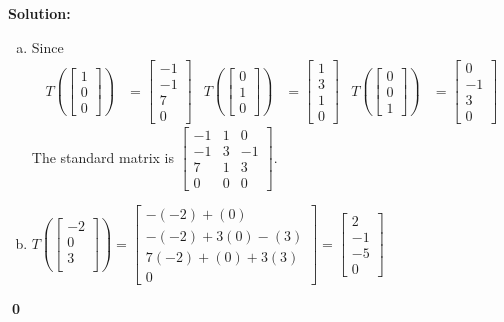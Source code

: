 \documentclass{article}
\newenvironment{solution}
{
  \ignorespaces
  \textbf{Solution:}
}
{
  \ignorespacesafterend
  \begin{flushright}
  {\bfseries \qed}
  \end{flushright}
}
\begin{document}
\begin{solution}
\begin{enumerate}[(a)]
\item Since
\begin{align*}
T\left(\begin{bmatrix} 1 \\ 0 \\ 0 \end{bmatrix}\right) &= \begin{bmatrix} -1 \\ -1 \\ 7 \\0\end{bmatrix} &
T\left(\begin{bmatrix} 0 \\ 1 \\ 0 \end{bmatrix}\right) &= \begin{bmatrix} 1 \\ 3 \\ 1 \\0 \end{bmatrix}  &
T\left(\begin{bmatrix} 0 \\ 0 \\ 1 \end{bmatrix}\right) &= \begin{bmatrix} 0 \\ -1 \\ 3 \\ 0  \end{bmatrix}
\end{align*}
The standard matrix is \( \begin{bmatrix} -1 & 1 & 0 \\ -1 & 3 & -1 \\ 7 & 1 & 3  \\ 0 & 0 & 0 \end{bmatrix} \).
\item \(
T\left(\begin{bmatrix} -2 \\ 0 \\ 3 \\  \end{bmatrix} \right) =
\begin{bmatrix} -(-2)+(0) \\ -(-2)+3(0)-(3) \\ 7(-2)+(0)+3(3) \\ 0\end{bmatrix}
  =
\begin{bmatrix} 2 \\ -1 \\ -5 \\ 0 \end{bmatrix}
\)


\end{enumerate}
\end{solution}
\end{document}
